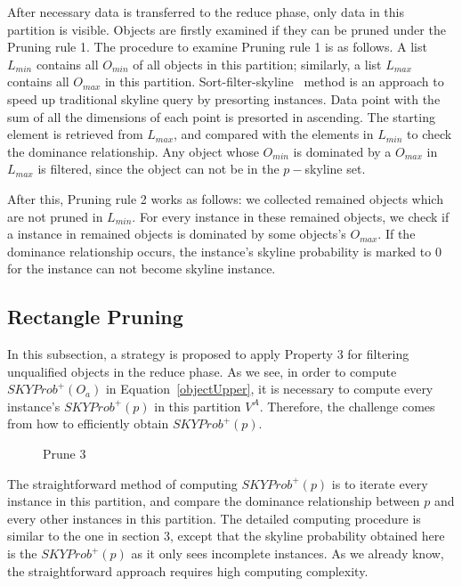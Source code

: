 After necessary data is transferred to the reduce phase, only data in this partition is visible. Objects are firstly examined if they can be pruned under the Pruning rule 1. The procedure to examine Pruning rule 1 is as follows. A list $L_{min}$ contains all $O_{min}$ of all objects in this partition; similarly, a list $L_{max}$ contains all $O_{max}$ in this partition. Sort-filter-skyline~\cite{icde/ChomickiGGL03} method is an approach to speed up traditional skyline query by presorting instances. Data point with the sum of all the dimensions of each point is presorted in ascending. The starting element is retrieved from $L_{max}$, and compared with the elements in $L_{min}$ to check the dominance relationship. Any object whose $O_{min}$ is dominated by a $O_{max}$ in $L_{max}$ is filtered, since the object can not be in the $p-$skyline set.

After this, Pruning rule 2 works as follows: we collected remained objects which are not pruned in $L_{min}$. For every instance in these remained objects, we check if a instance in remained objects is dominated by some objects's $O_{max}$. If the dominance relationship occurs, the instance's skyline probability is marked to $0$ for the instance can not become skyline instance.

\subsection{Rectangle Pruning}
In this subsection, a strategy is proposed to apply Property 3 for filtering unqualified objects in the reduce phase. As we see, in order to compute $SKYProb^{+}(O_a)$ in Equation~\ref{objectUpper}, it is necessary to compute every instance's $SKYProb^{+}(p)$ in this partition $V^A$. Therefore, the challenge comes from how to efficiently obtain $SKYProb^{+}(p)$.

\begin{figure}[t]
\vspace{-15pt}
\centering
  \centerline{}
  \caption{Prune 3}
  \vspace{-15pt}
  \label{figure:rect}
\end{figure}

The straightforward method of computing $SKYProb^{+}(p)$ is to iterate every instance in this partition, and compare the dominance relationship between $p$ and every other instances in this partition. The detailed computing procedure is similar to the one in section 3, except that the skyline probability obtained here is the $SKYProb^{+}(p)$ as it only sees incomplete instances. As we already know, the straightforward approach requires high computing complexity.


